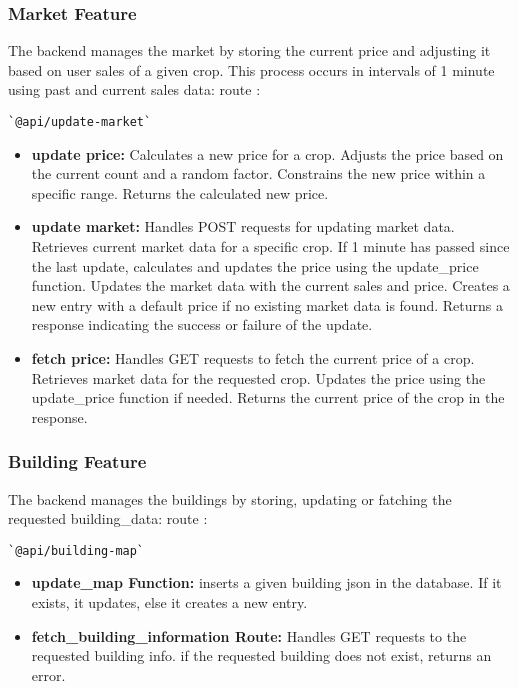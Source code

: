 \documentclass[12pt]{article}
\begin{document}
\subsubsection{Market Feature}
The backend manages the market by storing the current price and adjusting it based on user sales of a given crop. This process occurs in intervals of 1 minute using past and current sales data:
route : \begin{verbatim}`@api/update-market`\end{verbatim}
\begin{itemize}
    \item \textbf{update price:} Calculates a new price for a crop. Adjusts the price based on the current count and a random factor. Constrains the new price within a specific range. Returns the calculated new price.
    \item \textbf{update market:} Handles POST requests for updating market data. Retrieves current market data for a specific crop. If 1 minute has passed since the last update, calculates and updates the price using the update\_price function. Updates the market data with the current sales and price. Creates a new entry with a default price if no existing market data is found. Returns a response indicating the success or failure of the update.
    \item \textbf{fetch price:} Handles GET requests to fetch the current price of a crop. Retrieves market data for the requested crop. Updates the price using the update\_price function if needed. Returns the current price of the crop in the response.
\end{itemize}

\subsubsection{Building Feature}
The backend manages the buildings by storing, updating or fatching the requested building\_data:
route : \begin{verbatim}`@api/building-map`\end{verbatim}
\begin{itemize}
    \item \textbf{update\_map Function:} inserts a given building json in the database. If it exists, it updates, else it creates a new entry.
    \item \textbf{fetch\_building\_information Route:} Handles GET requests to the requested building info. if the requested building does not exist, returns an error.
\end{itemize}
\end{document}
